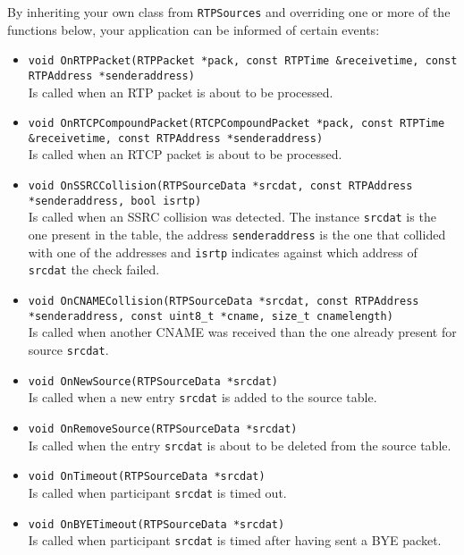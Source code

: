 \documentclass[12pt,a4paper]{article}
\begin{document}
				By inheriting your own class from {\tt RTPSources} and overriding
				one or more of the functions below, your application can be informed
				of certain events:
				\begin{itemize}
					\item {\tt void OnRTPPacket(RTPPacket *pack, const RTPTime \&receivetime,
					                                    const RTPAddress *senderaddress)}\\
						Is called when an RTP packet is about to be processed.
					\item {\tt void OnRTCPCompoundPacket(RTCPCompoundPacket *pack, const RTPTime \&receivetime,
					                                             const RTPAddress *senderaddress)}\\
						Is called when an RTCP packet is about to be processed.
					\item {\tt void OnSSRCCollision(RTPSourceData *srcdat, const RTPAddress *senderaddress, bool isrtp)}\\
						Is called when an SSRC collision was detected. The instance
						{\tt srcdat} is the one present in the table, the address
						{\tt senderaddress} is the one that collided with one of the
						addresses and {\tt isrtp} indicates against which address of
						{\tt srcdat} the check failed.
					\item {\tt void OnCNAMECollision(RTPSourceData *srcdat, const RTPAddress *senderaddress,
					                                         const uint8\_t *cname, size\_t cnamelength)}\\
						Is called when another CNAME was received than the one
						already present for source {\tt srcdat}.
					\item {\tt void OnNewSource(RTPSourceData *srcdat)}\\
						Is called when a new entry {\tt srcdat} is added to the source
						table.
					\item {\tt void OnRemoveSource(RTPSourceData *srcdat)}\\
						Is called when the entry {\tt srcdat} is about to be
						deleted from the source table.
					\item {\tt void OnTimeout(RTPSourceData *srcdat)}\\
						Is called when participant {\tt srcdat} is timed out.
					\item {\tt void OnBYETimeout(RTPSourceData *srcdat)}\\
						Is called when participant {\tt srcdat} is timed after
						having sent a BYE packet.

\end{itemize}
\end{document}
